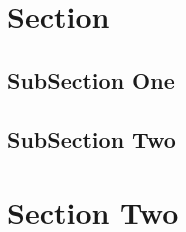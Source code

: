 \documentclass[12pt, twoside]{article}
\title{\vspace{-2cm}\runtitle\vspace{-5mm}}
\author{\runauthor\vspace{-5mm}}
\date{\today}
\begin{document}

\maketitle\thispagestyle{firststyle}

\section{Section}

\subsection{SubSection One}

\lipsum[2-4]



\subsection{SubSection Two}

\lipsum[3-5]

\section{Section Two}

\lipsum[1-5]
\end{document}

